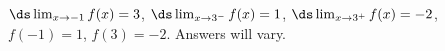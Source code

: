 {$\ds \lim_{x\to -1} f(x)=3$, \quad $\ds \lim_{x\to 3^-} f(x)=1$, \quad $\ds \lim_{x\to 3^+} f(x)=-2$, \quad $f(-1)=1$, \quad $f(3)=-2$.}
{Answers will vary.}
